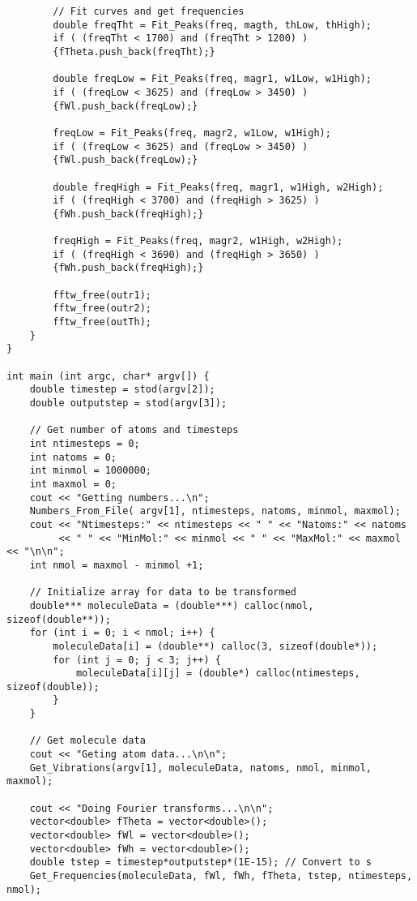 \begin{singlespace}
\begin{verbatim}
        // Fit curves and get frequencies
        double freqTht = Fit_Peaks(freq, magth, thLow, thHigh);
        if ( (freqTht < 1700) and (freqTht > 1200) ) 
        {fTheta.push_back(freqTht);}

        double freqLow = Fit_Peaks(freq, magr1, w1Low, w1High);
        if ( (freqLow < 3625) and (freqLow > 3450) ) 
        {fWl.push_back(freqLow);}

        freqLow = Fit_Peaks(freq, magr2, w1Low, w1High);
        if ( (freqLow < 3625) and (freqLow > 3450) ) 
        {fWl.push_back(freqLow);}

        double freqHigh = Fit_Peaks(freq, magr1, w1High, w2High);
        if ( (freqHigh < 3700) and (freqHigh > 3625) ) 
        {fWh.push_back(freqHigh);}

        freqHigh = Fit_Peaks(freq, magr2, w1High, w2High);
        if ( (freqHigh < 3690) and (freqHigh > 3650) ) 
        {fWh.push_back(freqHigh);}

        fftw_free(outr1);
        fftw_free(outr2);
        fftw_free(outTh);
    }
}

int main (int argc, char* argv[]) {
    double timestep = stod(argv[2]);
    double outputstep = stod(argv[3]);

    // Get number of atoms and timesteps
    int ntimesteps = 0;
    int natoms = 0;
    int minmol = 1000000;
    int maxmol = 0;
    cout << "Getting numbers...\n";
    Numbers_From_File( argv[1], ntimesteps, natoms, minmol, maxmol);
    cout << "Ntimesteps:" << ntimesteps << " " << "Natoms:" << natoms 
         << " " << "MinMol:" << minmol << " " << "MaxMol:" << maxmol << "\n\n";
    int nmol = maxmol - minmol +1;

    // Initialize array for data to be transformed
    double*** moleculeData = (double***) calloc(nmol, sizeof(double**));
    for (int i = 0; i < nmol; i++) {
        moleculeData[i] = (double**) calloc(3, sizeof(double*));
        for (int j = 0; j < 3; j++) {
            moleculeData[i][j] = (double*) calloc(ntimesteps, sizeof(double));
        }
    }

    // Get molecule data
    cout << "Geting atom data...\n\n";
    Get_Vibrations(argv[1], moleculeData, natoms, nmol, minmol, maxmol);

    cout << "Doing Fourier transforms...\n\n";
    vector<double> fTheta = vector<double>();
    vector<double> fWl = vector<double>();
    vector<double> fWh = vector<double>();
    double tstep = timestep*outputstep*(1E-15); // Convert to s
    Get_Frequencies(moleculeData, fWl, fWh, fTheta, tstep, ntimesteps, nmol);



\end{verbatim}
\end{singlespace}
